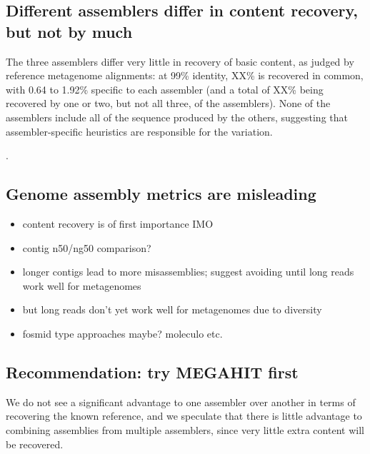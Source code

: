 \documentclass[10pt,a4paper,twocolumn]{article}
\begin{document}
\subsection*{Different assemblers differ in content recovery, but not by much}

The three assemblers differ very little in recovery of basic content,
as judged by reference metagenome alignments: at 99\% identity, XX\%
is recovered in common, with 0.64 to 1.92\% specific to each assembler
(and a total of XX\% being recovered by one or two, but not all three,
of the assemblers). None of the assemblers include all of the sequence
produced by the others, suggesting that assembler-specific heuristics
are responsible for the variation.

. %

\subsection*{Genome assembly metrics are misleading}

\begin{itemize}
\item content recovery is of first importance IMO
\item contig n50/ng50 comparison?
\item longer contigs lead to more misassemblies; suggest avoiding until long reads work well for metagenomes
\item but long reads don't yet work well for metagenomes due to diversity
\item fosmid type approaches maybe? moleculo etc.
\end{itemize}

\subsection*{Recommendation: try MEGAHIT first}

We do not see a significant advantage to one assembler over another in
terms of recovering the known reference, and we speculate that there
is little advantage to combining assemblies from multiple assemblers,
since very little extra content will be recovered.
\end{document}
